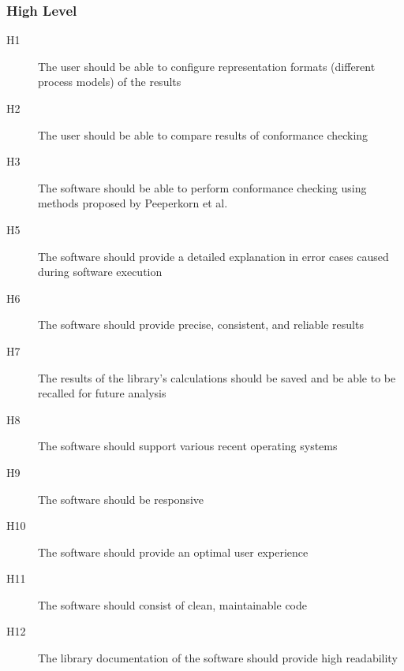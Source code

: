 \documentclass{article}
\begin{document}
\subsubsection{High Level}
\begin{description}
\item [H1] The user should be able to configure representation formats (different process models) of the results
\item [H2] The user should be able to compare results of conformance checking
\item [H3] The software should be able to perform conformance checking using methods proposed by Peeperkorn et al.\cite{inbook}
\item [H5] The software should provide a detailed explanation in error cases caused during software execution
\item [H6] The software should provide precise, consistent, and reliable results
\item [H7] The results of the library's calculations should be saved and be able to be recalled for future analysis
\item [H8] The software should support various recent operating systems
\item [H9] The software should be responsive
\item [H10] The software should provide an optimal user experience
\item [H11] The software should consist of clean, maintainable code
\item [H12] The library documentation of the software should provide high readability
\end{description}
\end{document}
